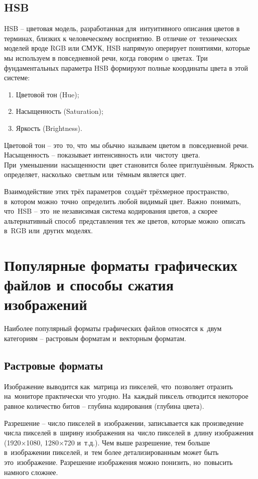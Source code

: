 \documentclass{ou}
\begin{document}
\subsection{HSB}
HSB -- цветовая модель, разработанная для~интуитивного описания цветов в терминах, близких к человеческому восприятию. В отличие от~технических моделей вроде RGB или СМУК, HSB напрямую оперирует понятиями, которые мы используем в повседневной речи, когда говорим о~цветах. Три фундаментальных параметра HSB формируют полные координаты цвета в этой системе: 
\begin{enumerate}[itemindent=2em, nosep, label=\arabic*)]
\item Цветовой тон (Hue);
\item Насыщенность (Saturation);
\item Яркость (Brightness).
\end{enumerate}

Цветовой тон -- это~то, что~мы обычно~называем цветом в~повседневной речи. Насыщенность -- показывает интенсивность или~чистоту~цвета. При~уменьшении~насыщенности~цвет становится более приглушённым. Яркость определяет, насколько~светлым или~тёмным является цвет. 

Взаимодействие этих трёх параметров~создаёт трёхмерное пространство, в~котором можно~точно~определить любой видимый цвет. Важно~понимать, что~HSB -- это~не независимая система кодирования цветов, а скорее альтернативный способ~представления тех же цветов, которые можно~описать в~RGB или~других моделях.
\newpage
\section{Популярные форматы графических файлов и способы сжатия изображений}
Наиболее популярный форматы графических файлов относятся к~двум категориям -- растровым форматам и~векторным форматам.
\subsection{Растровые форматы}
Изображение выводится как~матрица из пикселей, что~позволяет отразить на~мониторе практически что угодно. На~каждый пиксель отводится некоторое равное количество битов -- глубина кодирования (глубина цвета). 

Разрешение -- число пикселей в~изображении, записывается как произведение числа пикселей в~ширину изображения на~число пикселей в~длину изображения (1920×1080, 1280×720 и~т.д.). Чем выше разрешение, тем больше в~изображении пикселей, и~тем более детализированным может быть это~изображение. Разрешение изображения можно понизить, но~повысить намного сложнее.
\end{document}
